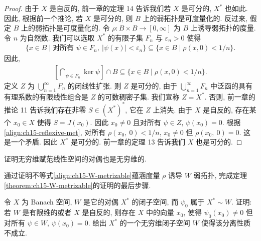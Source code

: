 \documentclass[../../main.tex]{subfiles}
\begin{document}
\begin{proof}
由于 $X$ 是自反的, 前一章的定理 14 告诉我们若 $X$ 是可分的, $X^{*}$ 也如此. 因此, 根据前一个推论, 若 $X$ 是可分的, 则 $B$ 上的弱拓扑是可度量化的. 反过来, 假定 $B$ 上的弱拓扑是可度量化的. 令 $\rho:B\times B\to[0,\infty]$ 为 $B$ 上诱导弱拓扑的度量. 令 $n$ 为自然数. 我们可以选取 $X^{*}$ 的有限子集 $F_{n}$ 与 $\varepsilon_{n}>0$ 使得
\begin{align*}
\{x\in B\mid\text{对所有 }\psi\in F_{n},\ |\psi(x)|<\varepsilon_{n}\}\subseteq\{x\in B\mid\rho(x,0)<1/n\}.
\end{align*}
因此,
\begin{align}
\left[\bigcap_{\psi\in F_{n}}\ker\psi\right]\cap B\subseteq\{x\in B\mid\rho(x,0)<1/n\}.\label{align:ch15-reflexive-met}
\end{align}
定义 $Z$ 为 $\bigcup_{n=1}^{\infty}F_{n}$ 的闭线性扩张. 则 $Z$ 是可分的, 由于 $\bigcup_{n=1}^{\infty}F_{n}$ 中泛函的具有有理系数的有限线性组合是 $Z$ 的可数稠密子集. 我们宣称 $Z=X^{*}$. 否则, 前一章的推论 11 告诉我们存在非零 $S\in(X^{*})^{*}$, 它在 $Z$ 上消失. 由于 $X$ 是自反的, 存在某个 $x_{0}\in X$ 使得 $S=J(x_{0})$. 因此 $x_{0}\neq 0$ 且对所有 $\psi\in Z$, $\psi(x_{0})=0$. 根据\eqref{align:ch15-reflexive-met}, 对所有 $\rho(x_{0},\ 0)<1/n$, $x_{0}\neq 0$ 但 $\rho(x_{0},\ 0)=0$. 这是一个矛盾. 因此 $X^{*}$ 是可分的. 前一章的定理 13 告诉我们 $X$ 也是可分的.
\end{proof}

\begin{exercise}\label{exercise:ch15-16}
证明无穷维赋范线性空间的对偶也是无穷维的.
\end{exercise}

\begin{exercise}\label{exercise:ch15-17}
通过证明不等式\eqref{align:ch15-W-metrizable}蕴涵度量 $\rho$ 诱导 $W$ 弱拓扑, 完成定理\cref{theorem:ch15-W-metrizable}的证明的最后步骤.
\end{exercise}

\begin{exercise}\label{exercise:ch15-18}
令 $X$ 为 Banach 空间, $W$ 是它的对偶 $X^{*}$ 的闭子空间, 而 $\psi_{0}$ 属于 $X^{*}\sim W$. 证明: 若 $W$ 是有限维的或者 $X$ 是自反的, 则存在 $X$ 中的向量 $x_{0}$, 使得 $\psi_{0}(x_{0})\neq 0$ 但对所有 $\psi\in W$, $\psi(x_{0})=0$. 给出 $X^{*}$ 的一个无穷维闭子空间 $W$ 使得该分离性质不成立.
\end{exercise}
\end{document}
